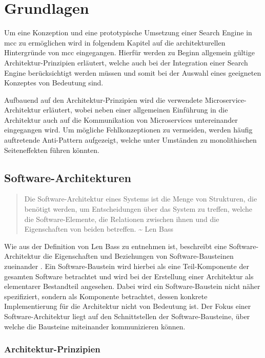 \chapter{Grundlagen\label{chap2:Zweites-Kapitel}}

Um eine Konzeption und eine prototypische Umsetzung einer Search Engine in \gls{mcc} zu ermöglichen wird in folgendem Kapitel auf die architekturellen Hintergründe von \gls{mcc} eingegangen. Hierfür werden zu Beginn allgemein gültige Architektur-Prinzipien erläutert, welche auch bei der Integration einer Search Engine berücksichtigt werden müssen und somit bei der Auswahl eines geeigneten Konzeptes von Bedeutung sind.

Aufbauend auf den Architektur-Prinzipien wird die verwendete Microservice-Architektur erläutert, wobei neben einer allgemeinen Einführung in die Architektur auch auf die Kommunikation von Microservices untereinander eingegangen wird. Um mögliche Fehlkonzeptionen zu vermeiden, werden häufig auftretende Anti-Pattern aufgezeigt, welche unter Umständen zu monolithischen Seiteneffekten führen könnten.

\section{Software-Architekturen\label{sec2.1:Unterpunkt-1}}

\begin{quote}
    Die Software-Architektur eines Systems ist die Menge von Strukturen, die benötigt werden, um Entscheidungen über das System zu treffen, welche die Software-Elemente, die Relationen zwischen ihnen und die Eigenschaften von beiden betreffen. \textasciitilde{} Len Bass \cite{Bass.2013}
\end{quote}

Wie aus der Definition von Len Bass zu entnehmen ist, beschreibt eine Software-Architektur die Eigenschaften und Beziehungen von Software-Bausteinen zueinander \cite{Bass.2013}. Ein Software-Baustein wird hierbei als eine Teil-Komponente der gesamten Software betrachtet und wird bei der Erstellung einer Architektur als elementarer Bestandteil angesehen. Dabei wird ein Software-Baustein nicht näher spezifiziert, sondern als Komponente betrachtet, dessen konkrete Implementierung für die Architektur nicht von Bedeutung ist. Der Fokus einer Software-Architektur liegt auf den Schnittstellen der Software-Bausteine, über welche die Bausteine miteinander kommunizieren können.

\subsection{Architektur-Prinzipien\label{subsec2.1.1:Unterunterpunkt-1}}

